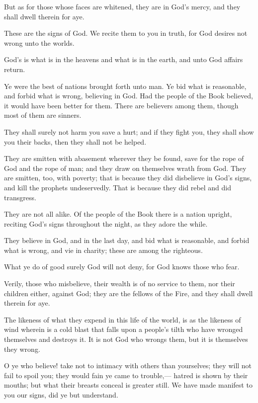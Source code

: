 \documentclass[fontsize=14pt, letterpaper, notitlepage, openany, DIV=12]{scrbook} %
\begin{document}
\noindent[3:107]
But as for those whose faces are whitened, they are in God's mercy, and they shall dwell
therein for aye.

\noindent[3:108]
These are the signs of God. We recite them to you in truth, for God desires not wrong
unto the worlds.

\noindent[3:109]
God's is what is in the heavens and what is in the earth, and unto God affairs return.

\noindent[3:110]
Ye were the best of nations brought forth unto man. Ye bid what is reasonable, and forbid
what is wrong, believing in God. Had the people of the Book believed, it would have been better
for them. There are believers among them, though most of them are sinners.

\noindent[3:111]
They shall surely not harm you save a hurt; and if they fight you, they shall show you
their backs, then they shall not be helped.

\noindent[3:112]
They are smitten with abasement wherever they be found, save for the rope of God and
the rope of man; and they draw on themselves wrath from God. They are smitten, too, with
poverty; that is because they did disbelieve in God's signs, and kill the prophets undeservedly.
That is because they did rebel and did transgress.

\noindent[3:113]
They are not all alike. Of the people of the Book there is a nation upright, reciting God's
signs throughout the night, as they adore the while.

\noindent[3:114]
They believe in God, and in the last day, and bid what is reasonable, and forbid what is
wrong, and vie in charity; these are among the righteous.

\noindent[3:115]
What ye do of good surely God will not deny, for God knows those who fear.

\noindent[3:116]
Verily, those who misbelieve, their wealth is of no service to them, nor their children
either, against God; they are the fellows of the Fire, and they shall dwell therein for aye.

\noindent[3:117]
The likeness of what they expend in this life of the world, is as the likeness of wind
wherein is a cold blast that falls upon a people's tilth who have wronged themselves and destroys
it. It is not God who wrongs them, but it is themselves they wrong.

\noindent[3:118]
O ye who believe! take not to intimacy with others than yourselves; they will not fail to
spoil you; they would fain ye came to trouble,--- hatred is shown by their mouths; but what their
breasts conceal is greater still. We have made manifest to you our signs, did ye but understand.
\end{document}
